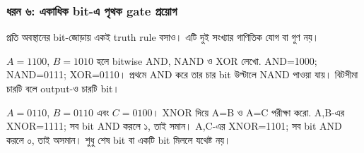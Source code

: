\subsubsection*{ধরন ৬: একাধিক bit-এ পৃথক gate প্রয়োগ}
প্রতি অবস্থানের bit-জোড়ায় একই truth rule বসাও। এটি দুই সংখ্যার গাণিতিক যোগ বা গুণ নয়।
\par\smallskip\noindent\begin{minipage}{\linewidth}
$A=1100$, $B=1010$ হলে bitwise AND, NAND ও XOR লেখো.
\chThreeAnswer AND=1000; NAND=0111; XOR=0110। প্রথমে AND করে তার চার bit উল্টালে NAND পাওয়া যায়। বিটসীমা চারটি বলে output-ও চারটি bit।

\end{minipage}\par\smallskip
\par\smallskip\noindent\begin{minipage}{\linewidth}
$A=0110$, $B=0110$ এবং $C=0100$। XNOR দিয়ে A=B ও A=C পরীক্ষা করো.
\chThreeAnswer A,B-এর XNOR=1111; সব bit AND করলে ১, তাই সমান। A,C-এর XNOR=1101; সব bit AND করলে ০, তাই অসমান। শুধু শেষ bit বা একটি bit মিললে যথেষ্ট নয়।

\end{minipage}\par\smallskip
{}

